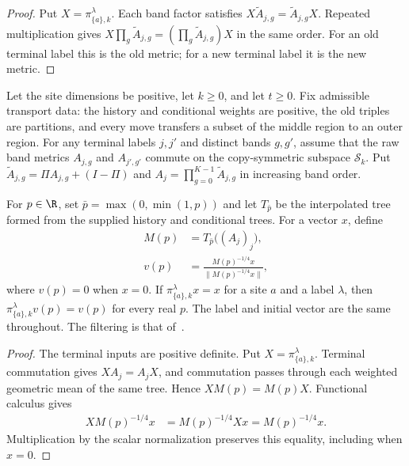 \begin{proof}
    \leanok
    Put $X=\pi^\lambda_{\{a\},k}$. Each band factor satisfies
    $X\widetilde A_{j,g}=\widetilde A_{j,g}X$. Repeated multiplication
    gives
    $X\prod_g\widetilde A_{j,g}=(\prod_g\widetilde A_{j,g})X$ in the
    same order. For an old terminal label this is the old metric; for
    a new terminal label it is the new metric.
\end{proof}

\begin{theorem}
    \label{thm:transport_filtered_singleton_label}
    \leanok
    Let the site dimensions be positive, let $k\ge0$, and let $t\ge0$.
    Fix admissible transport data: the history and conditional weights
    are positive, the old triples are partitions, and every move transfers
    a subset of the middle region to an outer region. For any terminal
    labels $j,j'$ and distinct bands $g,g'$, assume that the raw band
    metrics $A_{j,g}$ and $A_{j',g'}$ commute on the copy-symmetric
    subspace $\mathcal S_k$. Put
    $\widetilde A_{j,g}=\Pi A_{j,g}+(I-\Pi)$ and
    $A_j=\prod_{g=0}^{K-1}\widetilde A_{j,g}$ in increasing band order.

    For $p\in\R$, set $\bar p=\max(0,\min(1,p))$ and let
    $T_{\bar p}$ be the interpolated tree formed from the supplied
    history and conditional trees. For a vector $x$, define
    \begin{align*}
        M(p) & =T_{\bar p}\bigl((A_j)_j\bigr),         \\
        v(p) & =\frac{M(p)^{-1/4}x}{\|M(p)^{-1/4}x\|},
    \end{align*}
    where $v(p)=0$ when $x=0$. If
    $\pi^\lambda_{\{a\},k}x=x$ for a site $a$ and a label $\lambda$,
    then $\pi^\lambda_{\{a\},k}v(p)=v(p)$ for every real $p$.
    The label and initial vector are the same throughout. The filtering
    is that of~\cite[Proposition~7.4]{OpenAI2026AreaLaw}.
\end{theorem}

\begin{proof}
    \leanok
    The terminal inputs are positive definite. Put
    $X=\pi^\lambda_{\{a\},k}$. Terminal commutation gives $XA_j=A_jX$,
    and commutation passes through each weighted geometric mean of the
    same tree. Hence $XM(p)=M(p)X$. Functional calculus gives
    \begin{align*}
        XM(p)^{-1/4}x & =M(p)^{-1/4}Xx=M(p)^{-1/4}x.
    \end{align*}
    Multiplication by the scalar normalization preserves this equality,
    including when $x=0$.
\end{proof}
